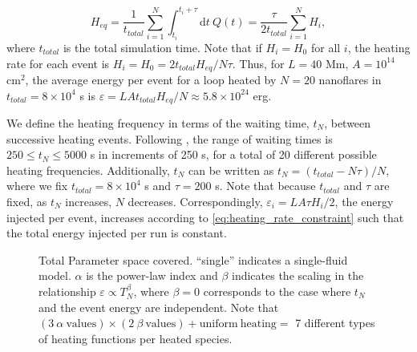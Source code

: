 \documentclass[preprint,linenumbers]{aastex}
\begin{document}
	\begin{equation}
		\label{eq:heating_rate_constraint}
		H_{eq} = \frac{1}{t_{total}}\sum_{i=1}^N\int_{t_i}^{t_i+\tau}\mathrm{d}t~Q(t) = \frac{\tau}{2t_{total}}\sum_{i=1}^NH_i,
	\end{equation}
	where $t_{total}$ is the total simulation time. Note that if $H_i=H_0$ for all $i$, the heating rate for each event is $H_i=H_0=2t_{total}H_{eq}/N\tau$. Thus, for $L=40$ Mm, $A=10^{14}$ cm$^2$, the average energy per event for a loop heated by $N=20$ nanoflares in $t_{total}=8\times10^4$ s is $\varepsilon=LAt_{total}H_{eq}/N\approx5.8\times10^{24}$ erg. 
	\par We define the heating frequency in terms of the waiting time, $t_N$, between successive heating events. Following \citet{cargill_active_2014}, the range of waiting times is $250\le t_N\le5000$ s in increments of 250 s, for a total of 20 different possible heating frequencies. Additionally, $t_N$ can be written as $t_N=(t_{total}-N\tau)/N$, where we fix $t_{total}=8\times10^4$ s and $\tau=200$ s. Note that because $t_{total}$ and $\tau$ are fixed, as $t_N$ increases, $N$ decreases. Correspondingly, $\varepsilon_i=LA\tau H_i/2$, the energy injected per event, increases according to \autoref{eq:heating_rate_constraint} such that the total energy injected per run is constant.
	\begin{figure}
		\centering
		
		\caption{Total Parameter space covered. ``single'' indicates a single-fluid model. $\alpha$ is the power-law index and $\beta$ indicates the scaling in the relationship $\varepsilon\propto T_N^{\beta}$, where $\beta=0$ corresponds to the case where $t_N$ and the event energy are independent. Note that $(3~\alpha~\mathrm{values})\times(2~\beta~\mathrm{values})+\mathrm{uniform~heating}=$ 7 different types of heating functions per heated species.}
		\label{fig:parameter_space}
	\end{figure}
\end{document}
